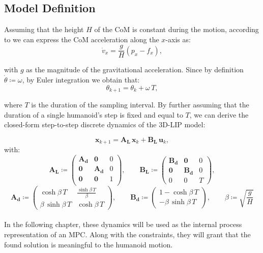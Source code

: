 \documentclass[main.tex]{subfiles}
\begin{document}
\subsection{Model Definition}
Assuming that the height $H$ of the CoM is constant during the motion, according to \cite{peng_main_paper} we can express the CoM acceleration along the $x$-axis as:
$$
\dot{v}_x = \frac{g}{H}\left(p_x - f_x\right),
$$

with $g$ as the magnitude of the gravitational acceleration. Since by definition $\dot{\theta} \coloneqq \omega$, by Euler integration we obtain that:
$$
\theta_{k+1} = \theta_k + \omega \, T,
$$

where $T$ is the duration of the sampling interval. By further assuming that the duration of a single humanoid's step is fixed and equal to $T$, we can derive the closed-form step-to-step discrete dynamics of the 3D-LIP model:

\begin{equation}\label{eq:lip_dyanmics}
\mathbf{x}_{k+1} = \mathbf{A_L} \, \mathbf{x}_k + \mathbf{B_L} \, \mathbf{u}_k,
\end{equation}
with:
$$
\mathbf{A_L} \coloneqq 
\begin{pmatrix}
\mathbf{A_d} & \mathbf{0} & 0 \\
\mathbf{0} & \mathbf{A_d} & 0 \\
\mathbf{0} & \mathbf{0} & 1 \\
\end{pmatrix}, \qquad
\mathbf{B_L} \coloneqq 
\begin{pmatrix}
\mathbf{B_d} & \mathbf{0} & 0 \\
\mathbf{0} & \mathbf{B_d} & 0 \\
0 & 0 & T
\end{pmatrix},
$$
$$
\mathbf{A_d} \coloneqq 
\begin{pmatrix}
\cosh{\beta \, T} & \frac{\sinh{\beta \, T}}{\beta}  \\
\beta \, \sinh{\beta \, T} & \cosh{\beta \, T}
\end{pmatrix}, \qquad
\mathbf{B_d} \coloneqq 
\begin{pmatrix}
1 - \cosh{\beta \, T} \\
-\beta \, \sinh{\beta \, T}
\end{pmatrix}, \qquad
\beta \coloneqq \sqrt{\frac{g}{H}}
$$
\\
In the following chapter, these dynamics will be used as the internal process representation of an MPC. Along with the constraints, they will grant that the found solution is meaningful to the humanoid motion.
\end{document}
